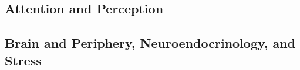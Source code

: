 % 
% 
% 
% 
% 
% 
% 
% 
% 
% 
% 
% 
% 
% 
% 
% 
% 
% 
% 

\subsection*{Attention and Perception}

% 
% 
% 
% 
% 
% 
% 
% 
% 
% 
% 

\subsection*{Brain and Periphery, Neuroendocrinology, and Stress}

% 
% 
% 
% 
% 
% 
% 
% 
% 
% 
% 
% 
% 
% 
% 
% 
% 
% 

